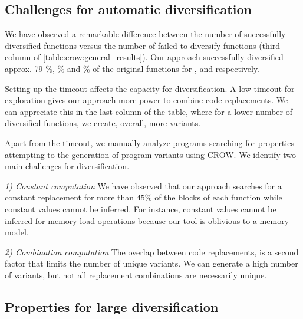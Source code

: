 


\subsection*{Challenges for automatic diversification}
\label{rq1:challenges}

We have observed a remarkable difference between the number of successfully diversified functions versus the number of failed-to-diversify functions (third column of \autoref{table:crow:general_results}). Our approach successfully diversified approx. 79 \%, \% and \% of the original functions for \corpusrosetta, \corpussodium and \corpusqrcode respectively. 

Setting up the timeout affects the capacity for diversification. A low timeout for exploration gives our approach more power to combine code replacements. We can appreciate this in the last column of the table, where for a lower number of diversified functions, we create, overall, more variants.


Apart from the timeout, we manually analyze programs searching for properties attempting to the generation of program variants using CROW.
We identify two main challenges for diversification.

\emph{1) Constant computation}  We have observed that our approach searches for a constant replacement for more than $45\%$ of the blocks of each function while constant values cannot be inferred. For instance, constant values cannot be inferred for memory load operations because our tool is oblivious to a memory model. 

\emph{2) Combination computation}  The overlap between code replacements, is a second factor that limits the number of unique variants. We can generate a high number of variants, but not all replacement combinations are necessarily unique.



\subsection*{Properties for large diversification}

